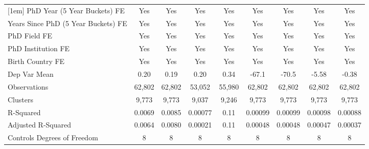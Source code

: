 \begin{table}[htbp]
\begin{tabular}{l*{8}{c}}
[1em]
PhD Year (5 Year Buckets) FE&         Yes         &         Yes         &         Yes         &         Yes         &         Yes         &         Yes         &         Yes         &         Yes         \\
[1em]
Years Since PhD (5 Year Buckets) FE&         Yes         &         Yes         &         Yes         &         Yes         &         Yes         &         Yes         &         Yes         &         Yes         \\
[1em]
PhD Field FE&         Yes         &         Yes         &         Yes         &         Yes         &         Yes         &         Yes         &         Yes         &         Yes         \\
[1em]
PhD Institution FE&         Yes         &         Yes         &         Yes         &         Yes         &         Yes         &         Yes         &         Yes         &         Yes         \\
[1em]
Birth Country FE&         Yes         &         Yes         &         Yes         &         Yes         &         Yes         &         Yes         &         Yes         &         Yes         \\
\hline
Dep Var Mean&        0.20         &        0.19         &        0.20         &        0.34         &       -67.1         &       -70.5         &       -5.58         &       -0.38         \\
Observations&      62,802         &      62,802         &      53,052         &      55,980         &      62,802         &      62,802         &      62,802         &      62,802         \\
Clusters&       9,773         &       9,773         &       9,037         &       9,246         &       9,773         &       9,773         &       9,773         &       9,773         \\
R-Squared&      0.0069         &      0.0085         &     0.00077         &        0.11         &     0.00099         &     0.00099         &     0.00098         &     0.00088         \\
Adjusted R-Squared&      0.0064         &      0.0080         &     0.00021         &        0.11         &     0.00048         &     0.00048         &     0.00047         &     0.00037         \\
Controls Degrees of Freedom&           8         &           8         &           8         &           8         &           8         &           8         &           8         &           8         \\

\end{tabular}
\end{table}
